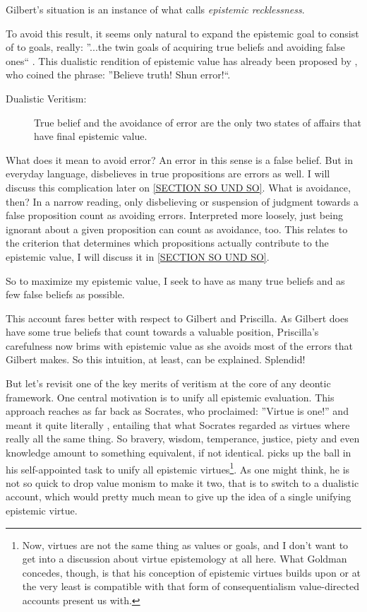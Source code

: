 \documentclass[12pt,numbers=noenddot]{scrartcl}
\begin{document}
Gilbert’s situation is an instance of what \textcite[360]{Berker2013-BERETA-2} calls \emph{epistemic recklessness}. 

To avoid this result, it seems only natural to expand the epistemic goal to consist of to goals, really: ”...the twin goals of acquiring true beliefs and avoiding false ones“ \textcite[339]{Berker2013-BERETA-2}. This dualistic rendition of epistemic value has already been proposed by \textcite[17]{James1896-JAMTWT-19}, who coined the phrase: ”Believe truth! Shun error!“.

\begin{description}
    \item[Dualistic Veritism:] True belief and the avoidance of error are the only two states of affairs that have final epistemic value.
\end{description}
\label{SECTION SO UND SO}
What does it mean to avoid error? An error in this sense \textcite[362]{Berker2013-BERETA-2} is a false belief. But in everyday language, disbelieves in true propositions are errors as well. I will discuss this complication later on \ref{SECTION SO UND SO}. What is avoidance, then? In a narrow reading, only disbelieving or suspension of judgment towards a false proposition count as avoiding errors. Interpreted more loosely, just being ignorant about a given proposition can count as avoidance, too. This relates to the criterion that determines which propositions actually contribute to the epistemic value, I will discuss it in \ref{SECTION SO UND SO}.

So to maximize my epistemic value, I seek to have as many true beliefs and as few false beliefs as possible.

This account fares better with respect to Gilbert and Priscilla. As Gilbert does have some true beliefs that count towards a valuable position, Priscilla’s carefulness now brims with epistemic value as she avoids most of the errors that Gilbert makes. So this intuition, at least, can be explained. Splendid!

But let's revisit one of the key merits of veritism at the core of any deontic framework. One central motivation is to unify all epistemic evaluation. This approach reaches as far back as Socrates, who proclaimed: ”Virtue is one!” and meant it quite literally \textcite{penner1973}, entailing that what Socrates regarded as virtues where really all the same thing. So bravery, wisdom, temperance, justice, piety and even knowledge amount to something equivalent, if not identical.
\textcite{Goldman2002-GOLTUO-2} picks up the ball in his self-appointed task to unify all epistemic virtues\footnote{Now, virtues are not the same thing as values or goals, and I don't want to get into a discussion about virtue epistemology at all here. What Goldman concedes, though, is that his conception of epistemic virtues builds upon or at the very least is compatible with that form of consequentialism value-directed accounts present us with.}. As one might think, he is not so quick to drop value monism to make it two, that is to switch to a dualistic account, which would pretty much mean to give up the idea of a single unifying epistemic virtue.
\end{document}
